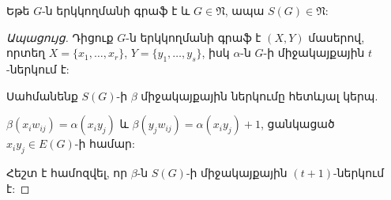 \begin{remark}
\label{r3_S(G)} Եթե $G$-ն երկկողմանի գրաֆ է և $G\in
\mathfrak{N}$, ապա $S(G)\in \mathfrak{N}$:
\end{remark}
\begin{proof}[Ապացույց]
Դիցուք $G$-ն երկկողմանի գրաֆ է $(X,Y)$ մասերով, որտեղ
$X=\{x_{1},\ldots,x_{r}\}$, $Y=\{y_{1},\ldots,y_{s}\}$, իսկ 
$\alpha$-ն $G$-ի միջակայքային $t$-ներկում է:

Սահմանենք $S(G)$-ի $\beta$ միջակայքային ներկումը հետևյալ կերպ.
\begin{center}
$\beta(x_{i}w_{ij})=\alpha(x_{i}y_{j})$ և
$\beta(y_{j}w_{ij})=\alpha(x_{i}y_{j})+1$, ցանկացած $x_{i}y_{j}\in
E(G)$-ի համար:
\end{center}

Հեշտ է համոզվել, որ $\beta$-ն $S(G)$-ի միջակայքային $(t+1)$-ներկում է:
\end{proof}

